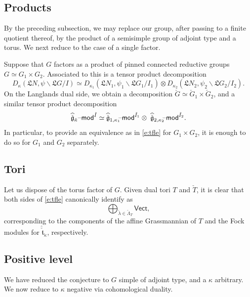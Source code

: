 \documentclass[11pt,reqno]{amsart}
\newcommand{\cgk}{\widehat{\check{\mathfrak{g}}}_{\check{\kappa}}}
\newcommand{\fL}{\mathfrak{L}}
\newcommand{\ft}{\mathfrak{t}}
\theoremstyle{remark}
\numberwithin{equation}{section}
\newcommand{\cG}{\check{G}}
\renewcommand{\mod}{\text{\textendash}\mathsf{mod}}
\begin{document}
\subsection{Products} By the preceding subsection, we may replace our group, 
after passing to a finite quotient thereof, by the product of a semisimple 
group of adjoint type and a torus. We next reduce to the case of a single 
factor. 


Suppose that $G$ factors as a product of pinned connected reductive groups $G 
\simeq G_1 \times G_2.$
Associated to this is a tensor product decomposition  
%
\[ D_\kappa(\mathfrak{L}N, \psi \backslash\fL G/I) \simeq 
D_{\kappa_1}(\fL N_1, \psi_1 \backslash \fL G_1 / I_1) 
\otimes D_{\kappa_2}(\fL 
N_2, \psi_2 \backslash \fL G_2 / I_2).
\]
%
On the Langlands dual side, we obtain a decomposition $\cG \simeq \cG_1 \times 
\cG_2$, and a similar tensor product decomposition 
%
\[\cgk\mod^{\check{I}} \simeq \widehat{\check{\mathfrak{g}}}_{1, 
	\kappa_1}\hspace{-1mm}\mod^{\check{I}_1}
\otimes \hspace{1mm} \widehat{\check{\mathfrak{g}}}_{2, 
	\kappa_2}\hspace{-1mm}\mod^{\check{I}_2}.
\]
%
In particular, to provide an equivalence as in \eqref{e:tfle} for $G_1 
\times G_2$, it is enough to do so for $G_1$ and $G_2$ separately. 

\subsection{Tori}Let us dispose of the torus factor of $G$. Given  dual tori 
$T$ and $\check{T}$, it is clear that both sides of 
\eqref{e:tfle} canonically identify as 
%
\[ \bigoplus_{\check{\lambda} \in \check{\Lambda}_T} \mathsf{Vect},
\]
%
corresponding to the components of the affine Grassmannian of $T$ and the Fock 
modules 
for $\widehat{\check{\ft}}_{\check{\kappa}}$, respectively. 

\subsection{Positive level} We have reduced the conjecture to $G$ simple of 
adjoint type, and a $\kappa$ arbitrary. We now reduce to $\kappa$ negative via 
cohomological duality.
\end{document}
